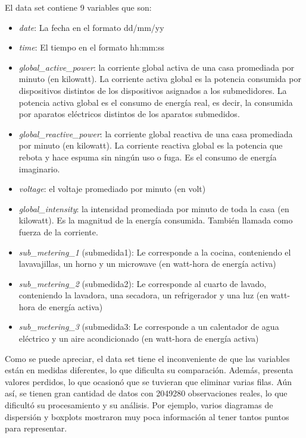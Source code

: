 \documentclass[a4paper,10pt,twocolumn]{report}
\begin{document}
	El data set contiene 9 variables que son:
	\begin{itemize}
		\item \textit{date}: La fecha en el formato dd/mm/yy
		\item \textit{time}: El tiempo en el formato hh:mm:ss
		\item \textit{global\_active\_power}: la corriente global activa de una casa promediada por minuto (en kilowatt). La corriente activa global es la potencia consumida por dispositivos distintos de los dispositivos asignados a los submedidores. La potencia activa global es el consumo de energía real, es decir, la consumida por aparatos eléctricos distintos de los aparatos submedidos.
		\item \textit{global\_reactive\_power}: la corriente global reactiva de una casa promediada por minuto (en kilowatt). La corriente reactiva global es la potencia que rebota y hace espuma sin ningún uso o fuga. Es el consumo de energía imaginario.
		\item \textit{voltage}: el voltaje promediado por minuto (en volt)
		\item \textit{global\_intensity}: la intensidad promediada por minuto de toda la casa (en kilowatt). Es la magnitud de la energía consumida. También llamada como fuerza de la corriente.
		\item \textit{sub\_metering\_1} (submedida1): Le corresponde a la cocina, conteniendo el lavavajillas, un horno y un microwave (en watt-hora de energía activa)
		\item \textit{sub\_metering\_2} (submedida2): Le corresponde al cuarto de lavado, conteniendo la lavadora, una secadora, un refrigerador y una luz (en watt-hora de energía activa)
		\item \textit{sub\_metering\_3} (submedida3: Le corresponde a un calentador de agua eléctrico y un aire acondicionado (en watt-hora de energía activa)
	\end{itemize}
	
	Como se puede apreciar, el data set tiene el inconveniente de que las variables están en medidas diferentes, lo que dificulta su comparación. Además, presenta valores perdidos, lo que ocasionó que se tuvieran que eliminar varias filas. Aún así, se tienen gran cantidad de datos con 2049280 observaciones reales, lo que dificultó su procesamiento y su análisis. Por ejemplo, varios diagramas de dispersión  y boxplots mostraron muy poca información al tener tantos puntos para representar. 
	
\end{document}
